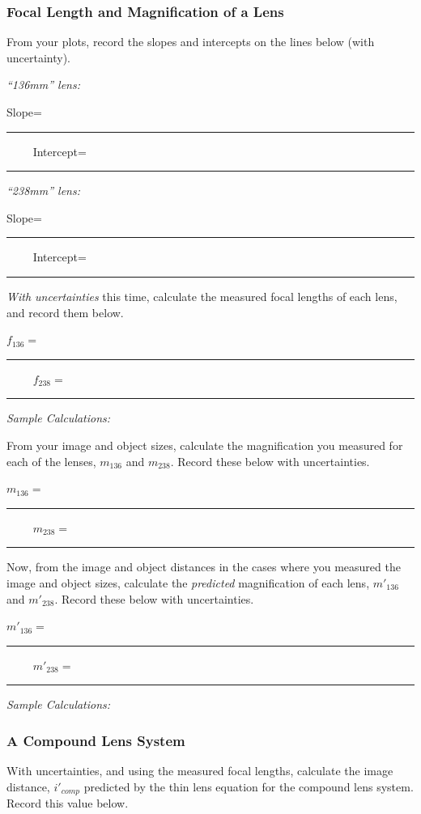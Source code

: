 \subsubsection{Focal Length and Magnification of a Lens}
From your plots, record the slopes and intercepts on the lines below (with
uncertainty).

\noindent
{\it ``136mm'' lens:}
\begin{center}
Slope=~\rule{3cm}{.1mm} ~~~~
Intercept=~\rule{3cm}{.1mm}
\end{center}
\vspace*{.5cm}

\noindent
{\it ``238mm'' lens:}
\begin{center}
Slope=~\rule{3cm}{.1mm} ~~~~
Intercept=~\rule{3cm}{.1mm}
\end{center}
\vspace*{.5cm}

\noindent
{\it With uncertainties} this time, calculate the measured focal lengths of
each lens, and record them below.

\begin{center}
$f_{136}=$~\rule{3cm}{.1mm} ~~~~
$f_{238}=$~\rule{3cm}{.1mm}
\end{center}
\noindent
{\it Sample Calculations:}
\vspace*{2cm}

\noindent
From your image and object sizes, calculate the magnification you measured for
each of the lenses, $m_{136}$ and $m_{238}.$ Record these below with
uncertainties.

\begin{center}
$m_{136}=$~\rule{3cm}{.1mm} ~~~~
$m_{238}=$~\rule{3cm}{.1mm}
\end{center}
\vspace*{.5cm}

Now, from the image and object distances in the cases where you measured the
image and object sizes, calculate the {\it predicted} magnification of each lens,
$m'_{136}$ and $m'_{238}.$ Record these below with uncertainties.

\begin{center}
$m'_{136}=$~\rule{3cm}{.1mm} ~~~~
$m'_{238}=$~\rule{3cm}{.1mm}
\end{center}
{\it Sample Calculations:}
\newpage

\subsubsection{A Compound Lens System}
With uncertainties, and using the measured focal lengths, 
calculate the image distance, $i'_{comp}$ predicted by the thin lens
equation for the compound lens system.  Record this value below.


